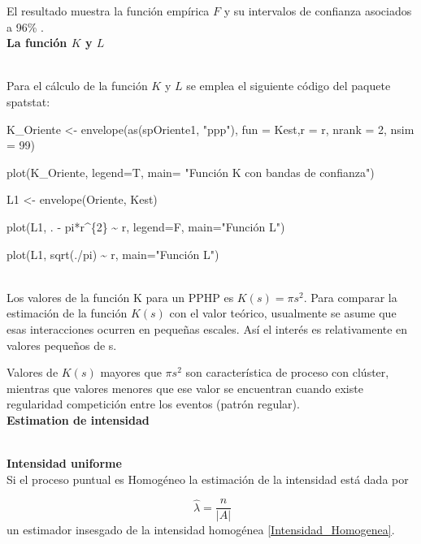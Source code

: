 \documentclass[12pt]{report}
\begin{document}
				
		     	El resultado muestra la función empírica $ F$ y su intervalos de confianza asociados a 96\% .\\
				
  \textbf{La función $K$ y $L$}{\label{K-codigo}\\
   	
				
				Para el cálculo de la función $K$ y $L$ se emplea el siguiente código del paquete spatstat:  \\
				
		
			
		{ \scriptsize  { \ttfamily	
				
				K\_Oriente <- envelope(as(spOriente1, "ppp"), fun = Kest,r = r, nrank = 2, nsim = 99)
				
				plot(K\_Oriente, legend=T,  main= "Función K con bandas de confianza")
				
				L1 <- envelope(Oriente, Kest) 
				
				plot(L1, . - pi*r\^{}\{2\} \~{} r, legend=F,  main="Función L")  \vspace{-0,15 cm} 
				
				
				plot(L1, sqrt(./pi) \~{} r, main="Función L")  }}  \\
			
	Los  valores de la función K para un PPHP es $K(s)=\pi s^2$.   Para comparar la estimación de la función $K(s)$ con el valor teórico, usualmente se  asume que esas interacciones ocurren en pequeñas escales. Así el interés es relativamente en valores pequeños de s. 
	
	 Valores de $K(s)$ mayores que $\pi s^{2}$ son característica de proceso con clúster, mientras que valores menores que ese valor se encuentran cuando existe regularidad competición entre los eventos (patrón regular).\\
				
				
		
			
   \textbf{Estimation de intensidad}{\label{Intensidad_Codigo}\\
				
					

   \textbf{Intensidad uniforme}\\
	
	
	Si el  proceso  puntual es  Homogéneo la estimación de la  intensidad  está dada por 
	
	\[ \: \widehat{\lambda} = \frac{n}{|A|} \] un estimador insesgado de la intensidad homogénea  \ref{Intensidad_Homogenea}.\\ 

}}
\end{document}

